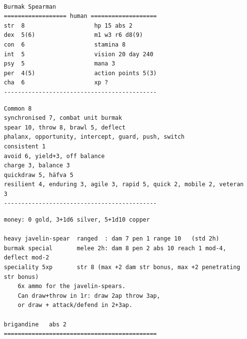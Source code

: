 \

\goodbreak \small \begin{samepage} \begin{verbatim}
Burmak Spearman
================== human ===================
str  8                    hp 15 abs 2
dex  5(6)                 m1 w3 r6 d8(9)
con  6                    stamina 8
int  5                    vision 20 day 240
psy  5                    mana 3
per  4(5)                 action points 5(3)
cha  6                    xp ?
--------------------------------------------
\end{verbatim} \goodbreak \begin{verbatim}
Common 8
synchronised 7, combat unit burmak
spear 10, throw 8, brawl 5, deflect
phalanx, opportunity, intercept, guard, push, switch
consistent 1
avoid 6, yield+3, off balance
charge 3, balance 3
quickdraw 5, häfva 5
resilient 4, enduring 3, agile 3, rapid 5, quick 2, mobile 2, veteran 3
--------------------------------------------
\end{verbatim} \goodbreak \begin{verbatim}
money: 0 gold, 3+1d6 silver, 5+1d10 copper

heavy javelin-spear  ranged  : dam 7 pen 1 range 10   (std 2h)
burmak special       melee 2h: dam 8 pen 2 abs 10 reach 1 mod-4, deflect mod-2
speciality 5xp       str 8 (max +2 dam str bonus, max +2 penetrating str bonus)
    6x ammo for the javelin-spears. 
    Can draw+throw in 1r: draw 2ap throw 3ap, 
    or draw + attack/defend in 2+3ap.
        
brigandine   abs 2
============================================
\end{verbatim} \end{samepage} \normalsize






























\clearpage
\raggedbottom
